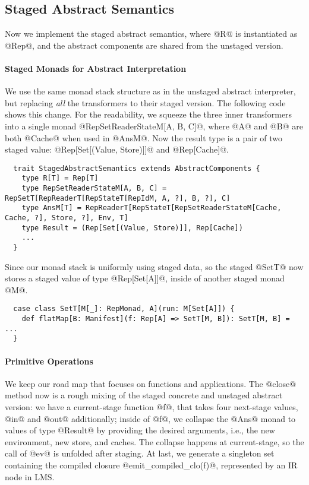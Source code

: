 \subsection{Staged Abstract Semantics}

Now we implement the staged abstract semantics, where @R@ is instantiated as
@Rep@, and the abstract components are shared from the unstaged version.

\paragraph{Staged Monads for Abstract Interpretation}
We use the same monad stack structure as in the unstaged abstract interpreter,
but replacing \textit{all} the transformers to their staged version. The
following code shows this change. For the readability, we squeeze the three
inner transformers into a single monad @RepSetReaderStateM[A, B, C]@, where @A@
and @B@ are both @Cache@ when used in @AnsM@. Now the result type is a pair of
two staged value: @Rep[Set[(Value, Store)]]@ and @Rep[Cache]@.

\begin{lstlisting}
  trait StagedAbstractSemantics extends AbstractComponents {
    type R[T] = Rep[T]
    type RepSetReaderStateM[A, B, C] = RepSetT[RepReaderT[RepStateT[RepIdM, A, ?], B, ?], C]
    type AnsM[T] = RepReaderT[RepStateT[RepSetReaderStateM[Cache, Cache, ?], Store, ?], Env, T]
    type Result = (Rep[Set[(Value, Store)]], Rep[Cache])
    ...
  }
\end{lstlisting}

Since our monad stack is uniformly using staged data, so the staged @SetT@ now
stores a staged value of type @Rep[Set[A]]@, inside of another staged monad @M@.

\begin{lstlisting}
  case class SetT[M[_]: RepMonad, A](run: M[Set[A]]) {
    def flatMap[B: Manifest](f: Rep[A] => SetT[M, B]): SetT[M, B] = ...
  }
\end{lstlisting}

\paragraph{Primitive Operations} We keep our road map that focuses on functions
and applications. The @close@ method now is a rough mixing of the staged
concrete and unstaged abstract version: we have a current-stage function @f@,
that takes four next-stage values, @in@ and @out@ additionally; inside of @f@,
we collapse the @Ans@ monad to values of type @Result@ by providing the desired
arguments, i.e., the new environment, new store, and caches. The collapse
happens at current-stage, so the call of @ev@ is unfolded after staging. At
last, we generate a singleton set containing the compiled closure
@emit_compiled_clo(f)@, represented by an IR node in LMS.


